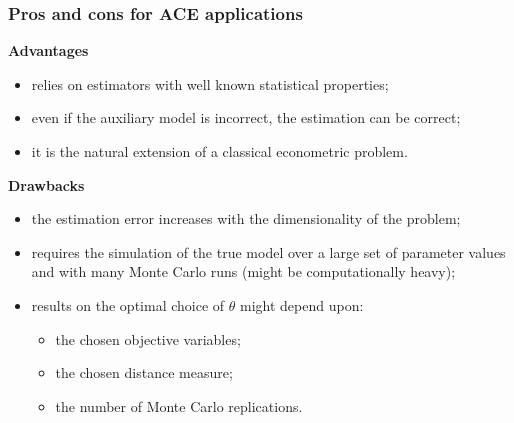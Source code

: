 \documentclass[10pt]{beamer}
\begin{document}




\begin{frame}[c]\frametitle{Pros and cons for ACE applications}
    \alert{\textbf{Advantages}} 
    \begin{itemize}
    	\item relies on estimators with well known statistical properties;
    	\item even if the auxiliary model is incorrect, the estimation can be correct;
    	\item it is the natural extension of a classical econometric problem.
    \end{itemize}

    \alert{\textbf{Drawbacks}} 
    \begin{itemize}
    	\item the estimation error increases with the dimensionality of the problem;
    	\item requires the simulation of the true model over a large set of parameter values and with many Monte Carlo runs (might be computationally heavy);
    	\item results on the optimal choice of $\theta$ might depend upon:
    	\begin{itemize}
    	 	\item the chosen objective variables;
    	 	\item the chosen distance measure;
    	 	\item the number of Monte Carlo replications.
    	\end{itemize} 
    \end{itemize}
\end{frame}
\end{document}
